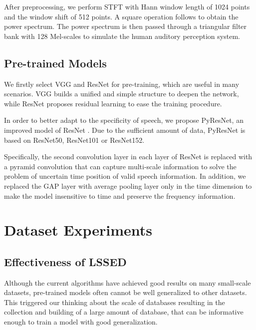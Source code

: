 \documentclass{article}
\begin{document}
After preprocessing, we perform STFT with Hann window length of 1024 points and the window shift of 512 points. A square operation follows to obtain the power spectrum.
The power spectrum is then passed through a triangular filter bank with 128 Mel-scales to simulate the human auditory perception system.


\subsection{Pre-trained Models}


We firstly select VGG \cite{simonyan2014very} and ResNet \cite{he2016deep} for pre-training, which are useful in many scenarios.
VGG builds a unified and simple structure to deepen the network, while ResNet proposes residual learning to ease the training procedure.

In order to better adapt to the specificity of speech, we propose PyResNet, an improved model of ResNet \cite{he2016deep}.
Due to the sufficient amount of data, PyResNet is based on ResNet50, ResNet101 or ResNet152.


Specifically, the second convolution layer in each layer of  ResNet is replaced with a pyramid convolution \cite{duta2020pyramidal} that can capture multi-scale information to solve the problem of uncertain time position of valid speech information.
In addition, we replaced the GAP layer with average pooling layer only in the time dimension to make the model insensitive to time and preserve the frequency information.









\section{Dataset Experiments}
\label{sec:experiments}



\subsection{Effectiveness of LSSED}
Although the current algorithms have achieved good results on many small-scale datasets, pre-trained models often cannot be well generalized to other datasets. This triggered our thinking about the scale of databases resulting in the collection and building of a large amount of database, that can be informative enough to train a model with good generalization.
\end{document}
